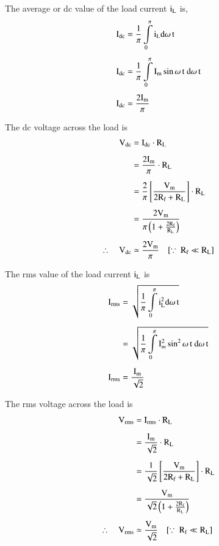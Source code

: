 The average or dc value of the load current $\textrm{i}_{\textrm{L}}$ is,
\begin{align}
\rmI_{\text{dc}} &= \frac{1}{\pi}\int\limits^{\pi}_{0}\rmi_{\rmL}\rmd\omega\,\rmt\notag\\[4pt]
\rmI_{\text{dc}} &= \frac{1}{\pi}\int\limits^{\pi}_{0}\rmI_{\rmm}\sin \omega\,\rmt \ \rmd\omega\,\rmt\notag\\[4pt]
\rmI_{\text{dc}} &= \frac{2\rmI_{\rmm}}{\pi}\label{eq1.24}
\end{align}

The dc voltage across the load is
\begin{align}
\textrm{V}_{\text{dc}} &= \textrm{I}_{\text{dc}}\cdot \textrm{R}_{\textrm{L}}\notag\\[5pt]
&= \frac{2\textrm{I}_{\textrm{m}}}{\pi}\cdot \textrm{R}_{\textrm{L}}\notag\\[5pt]
&= \frac{2}{\pi}\left[\frac{\textrm{V}_{\textrm{m}}}{2\textrm{R}_{\textrm{f}}+\textrm{R}_{\textrm{L}}}\right]\cdot \textrm{R}_{\textrm{L}}\notag\\[5pt]
&= \frac{2\textrm{V}_{\textrm{m}}}{\pi\left(1+\frac{2\textrm{R}_{\textrm{f}}}{\textrm{R}_{\textrm{L}}}\right)}\notag\\[5pt]
\therefore\quad \textrm{V}_{\text{dc}} &\simeq \frac{2\textrm{V}_{\textrm{m}}}{\pi}\quad [\because \ \textrm{R}_{\textrm{f}}\ll \textrm{R}_{\textrm{L}}]\label{eq1.25}
\end{align}

The rms value of the load current $\textrm{i}_{\textrm{L}}$ is
\begin{align}
\textrm{I}_{\text{rms}} &= \sqrt{\frac{1}{\pi}\int\limits^{\pi}_{0}\textrm{i}_{\textrm{L}}^{2} \textrm{d}\omega\,\textrm{t}}\notag\\[5pt]
&= \sqrt{\frac{1}{\pi}\int\limits^{\pi}_{0}\textrm{I}^{2}_{m}\sin^{2}\omega\,\textrm{t} \ \textrm{d}\omega\,\textrm{t}}\notag\\[5pt]
\textrm{I}_{\text{rms}} &= \frac{\textrm{I}_{\textrm{m}}}{\sqrt{2}}\label{eq1.26}
\end{align}

The rms voltage across the load is
\begin{align}
\textrm{V}_{\text{rms}} &= \textrm{I}_{\text{rms}}\cdot \textrm{R}_{\textrm{L}}\notag\\[5pt]
&= \frac{\textrm{I}_{\text{m}}}{\sqrt{2}}\cdot \textrm{R}_{\textrm{L}}\notag\\[5pt]
&= \frac{1}{\sqrt{2}}\left[\frac{\textrm{V}_{\textrm{m}}}{2\textrm{R}_{\textrm{f}}+\textrm{R}_{\textrm{L}}}\right]\cdot \textrm{R}_{\textrm{L}}\notag\\[5pt]
&= \frac{\textrm{V}_{\textrm{m}}}{\sqrt{2}\left(1+\frac{2\textrm{R}_{\textrm{f}}}{\textrm{R}_{\textrm{L}}}\right)}\notag\\[5pt]
\therefore\quad \textrm{V}_{\text{rms}} &\simeq \frac{\textrm{V}_{\textrm{m}}}{\sqrt{2}}\quad [\because \ \textrm{R}_{\textrm{f}}\ll \textrm{R}_{\textrm{L}}]\label{eq1.27}
\end{align}
        
